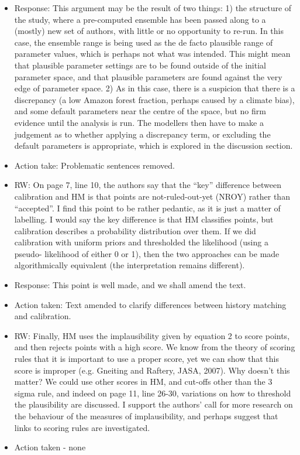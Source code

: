 \documentclass[esd, manuscript]{copernicus}
\begin{document}
\begin{itemize}
\item{Response: This argument may be the result of two things: 1) the structure of the study, where a pre-computed ensemble has been passed along to a (mostly) new set of authors, with little or no opportunity to re-run. In this case, the ensemble range is being used as the de facto plausible range of parameter values, which is perhaps not what was intended. This might mean that plausible parameter settings are to be found outside of the initial parameter space, and that plausible parameters are found against the very edge of parameter space. 2) As in this case, there is a suspicion that there is a discrepancy (a low Amazon forest fraction, perhaps caused by a climate bias), and some default parameters near the centre of the space, but no firm evidence until the analysis is run. The modellers then have to make a judgement as to whether applying a discrepancy term, or excluding the default parameters is appropriate, which is explored in the discussion section.}

\item{Action take: Problematic sentences removed.}


\item{RW: On page 7, line 10, the authors say that the ``key'' difference between calibration and HM is that points are not-ruled-out-yet (NROY) rather than ``accepted''. I find this point to be rather pedantic, as it is just a matter of labelling. I would say the key difference is that HM classifies points, but calibration describes a probability distribution over them. If we did calibration with uniform priors and thresholded the likelihood (using a pseudo- likelihood of either 0 or 1), then the two approaches can be made algorithmically equivalent (the interpretation remains different).}

\item{Response: This point is well made, and we shall amend the text.}

\item{Action taken: Text amended to clarify differences between history matching and calibration.}

\item{RW: Finally, HM uses the implausibility given by equation 2 to score points, and then rejects points with a high score. We know from the theory of scoring rules that it is important to use a proper score, yet we can show that this score is improper (e.g. Gneiting and Raftery, JASA, 2007). Why doesn't this matter? We could use other scores in HM, and cut-offs other than the 3 sigma rule, and indeed on page 11, line 26-30, variations on how to threshold the plausibility are discussed. I support the authors' call for more research on the behaviour of the measures of implausibility, and perhaps suggest that links to scoring rules are investigated.}

\item{Action taken - none}

\end{itemize}
\end{document}
